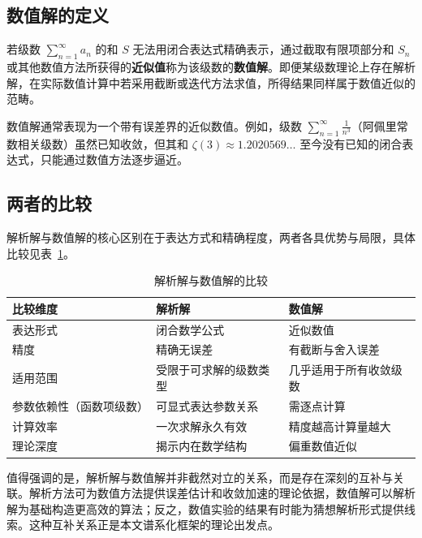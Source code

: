 \subsection{数值解的定义}

\begin{definition}
若级数 $\displaystyle \sum_{n=1}^{\infty} a_n$ 的和 $S$ 无法用闭合表达式精确表示，通过截取有限项部分和 $S_n$ 或其他数值方法所获得的\textbf{近似值}称为该级数的\textbf{数值解}。即便某级数理论上存在解析解，在实际数值计算中若采用截断或迭代方法求值，所得结果同样属于数值近似的范畴。
\end{definition}

数值解通常表现为一个带有误差界的近似数值。例如，级数 $\displaystyle \sum_{n=1}^{\infty} \frac{1}{n^3}$（阿佩里常数相关级数）虽然已知收敛，但其和 $\zeta(3) \approx 1.2020569\ldots$ 至今没有已知的闭合表达式，只能通过数值方法逐步逼近。

\subsection{两者的比较}

解析解与数值解的核心区别在于表达方式和精确程度，两者各具优势与局限，具体比较见表~\ref{tab:compare}。

\begin{table}[htbp]
\centering
\caption{解析解与数值解的比较}
\label{tab:compare}
\begin{tabularx}{\textwidth}{lXX}
\toprule
\textbf{比较维度} & \textbf{解析解} & \textbf{数值解} \\
\midrule
表达形式 & 闭合数学公式 & 近似数值 \\
精度 & 精确无误差 & 有截断与舍入误差 \\
适用范围 & 受限于可求解的级数类型 & 几乎适用于所有收敛级数 \\
参数依赖性（函数项级数） & 可显式表达参数关系 & 需逐点计算 \\
计算效率 & 一次求解永久有效 & 精度越高计算量越大 \\
理论深度 & 揭示内在数学结构 & 偏重数值近似 \\
\bottomrule
\end{tabularx}
\end{table}

值得强调的是，解析解与数值解并非截然对立的关系，而是存在深刻的互补与关联。解析方法可为数值方法提供误差估计和收敛加速的理论依据，数值解可以解析解为基础构造更高效的算法；反之，数值实验的结果有时能为猜想解析形式提供线索。这种互补关系正是本文谱系化框架的理论出发点。
